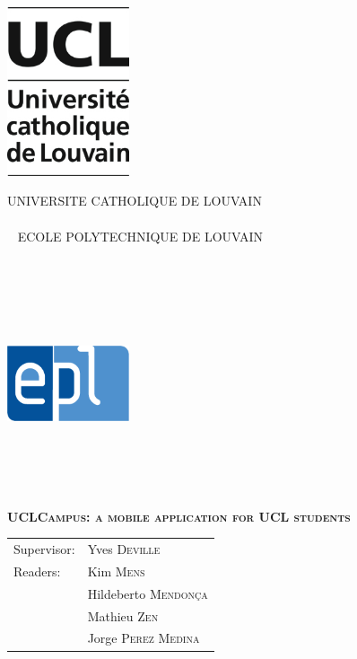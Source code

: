 \documentclass[11pt, a4paper]{report}
\renewcommand\title{UCLCampus: a mobile application for UCL students}
\newcommand\supervisor{Yves \textsc{Deville}}
\newcommand\readerone{Kim \textsc{Mens}}
\newcommand\readertwo{Hildeberto \textsc{Mendonça}}
\newcommand\readerthree{Mathieu \textsc{Zen}}
\newcommand\readerfour{Jorge \textsc{Perez Medina}}
\begin{document}
\thispagestyle{empty}
\noindent\begin{minipage}{.25\textwidth}
\noindent\includegraphics[width=3.6cm]{Images/ucl.jpg}
\end{minipage}
\begin{minipage}{.5\textwidth}
\begin{center}
UNIVERSITE CATHOLIQUE DE LOUVAIN
\\~\\~
ECOLE POLYTECHNIQUE DE LOUVAIN
\\~\\~\\~\\~\\~
\end{center}
\end{minipage}
\begin{minipage}{.25\textwidth}
\hfill\includegraphics[width=3.6cm]{Images/epl.jpg}
\\~\\~\\~\\~
\end{minipage}
\vspace{4.5cm}
\begin{center}
\bfseries{\scshape{\Huge{\title}}}
\end{center}
\vspace{4.5cm}
\begin{minipage}{.5\textwidth}
\begin{tabular}{ll}
Supervisor: & \supervisor
\\ Readers: & \readerone 
\\          & \readertwo 
\\          & \readerthree
\\          & \readerfour
\end{tabular} 
\\~\\~
\end{minipage}
\end{document}

